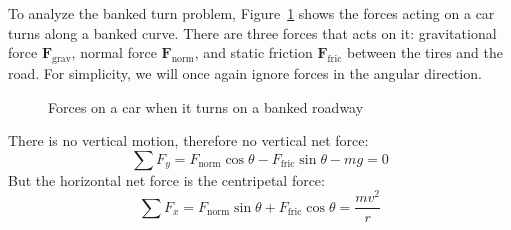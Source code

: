 To analyze the banked turn problem, Figure~\ref{fig:banked-turn-forces} shows
the forces acting on a car turns along a banked curve. There are three forces
that acts on it: gravitational force $\bm F_\text{grav}$, normal force
$\bm F_\text{norm}$, and static friction $\bm F_\text{fric}$ between the tires
and the road. For simplicity, we will once again ignore forces in the angular
direction.
\begin{figure}[ht]
  \centering
  \caption{Forces on a car when it turns on a banked roadway}
  \label{fig:banked-turn-forces}
\end{figure}

There is no vertical motion, therefore no vertical net force:
\begin{equation}
  \sum F_y=F_\text{norm}\cos\theta-F_\text{fric}\sin\theta-mg=0
  \label{eq:vertical-no-net-force}
\end{equation}
But the horizontal net force is the  centripetal force:
\begin{equation}
  \sum F_x=F_\text{norm}\sin\theta +F_\text{fric}\cos\theta = \frac{mv^2}r
  \label{eq:horizontal-centripetal-force}
\end{equation}
  





